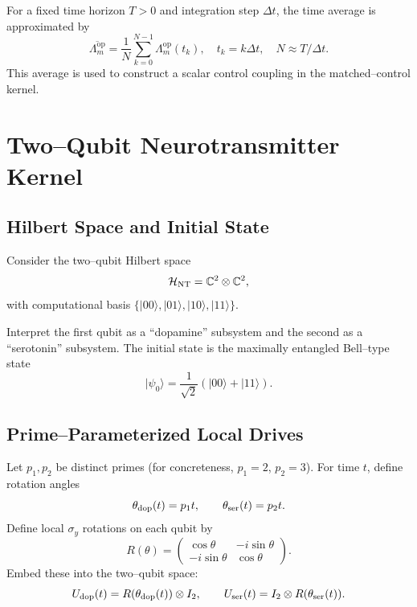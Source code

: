 \documentclass[11pt]{article}
\begin{document}
For a fixed time horizon \(T > 0\) and integration step \(\Delta t\), the time average is approximated by
\begin{equation}
  \overline{\Lambda_m^{\mathrm{op}}}
  = \frac{1}{N}\sum_{k=0}^{N-1} \Lambda_m^{\mathrm{op}}(t_k),
  \quad t_k = k \Delta t, \quad N \approx T/\Delta t.
\end{equation}
This average is used to construct a scalar control coupling in the matched–control kernel.

\section{Two–Qubit Neurotransmitter Kernel}

\subsection{Hilbert Space and Initial State}

Consider the two–qubit Hilbert space
\[
  \mathcal{H}_{\rm NT} = \mathbb{C}^2 \otimes \mathbb{C}^2,
\]
with computational basis \(\{|00\rangle,|01\rangle,|10\rangle,|11\rangle\}\).

Interpret the first qubit as a ``dopamine'' subsystem and the second as a ``serotonin'' subsystem. The initial state is the maximally entangled Bell–type state
\begin{equation}
  |\psi_0\rangle = \frac{1}{\sqrt{2}}(|00\rangle + |11\rangle).
\end{equation}

\subsection{Prime–Parameterized Local Drives}

Let \(p_1, p_2\) be distinct primes (for concreteness, \(p_1=2\), \(p_2=3\)). For time \(t\), define rotation angles
\begin{equation}
  \theta_{\rm dop}(t) = p_1 t, \qquad \theta_{\rm ser}(t) = p_2 t.
\end{equation}
Define local \(\sigma_y\) rotations on each qubit by
\begin{equation}
  R(\theta)
  = \begin{pmatrix}
      \cos\theta & -i\sin\theta \\
      -i\sin\theta & \cos\theta
    \end{pmatrix}.
\end{equation}
Embed these into the two–qubit space:
\begin{equation}
  U_{\rm dop}(t) = R(\theta_{\rm dop}(t)) \otimes I_2, \qquad
  U_{\rm ser}(t) = I_2 \otimes R(\theta_{\rm ser}(t)).
\end{equation}
\end{document}
